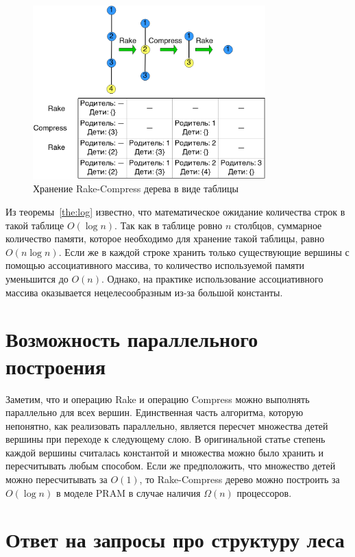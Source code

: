 \begin{figure}[h]
\centering
\includegraphics[width=0.8\textwidth]{pics/example.png}
\caption{Хранение Rake-Compress дерева в виде таблицы}
\label{pic:table}
\end{figure}


Из теоремы~\ref{the:log} известно, что математическое ожидание количества строк в такой таблице $O(\log n)$.  
Так как в таблице ровно $n$ столбцов, суммарное количество памяти, которое необходимо для хранение такой таблицы, равно $O(n \log n)$.
Если же в каждой строке хранить только существующие вершины с помощью ассоциативного массива, то количество используемой памяти уменьшится до $O(n)$. 
Однако, на практике использование ассоциативного массива оказывается нецелесообразным из-за большой константы.

\FloatBarrier
\section{Возможность параллельного построения}

Заметим, что и операцию Rake и операцию Compress можно выполнять параллельно для всех вершин. 
Единственная часть алгоритма, которую непонятно, как реализовать параллельно, является пересчет множества детей вершины при переходе к следующему слою. 
В оригинальной статье степень каждой вершины считалась константой и множества можно было хранить и пересчитывать любым способом. Если же предположить, 
что множество детей можно пересчитывать за $O(1)$, то Rake-Compress дерево можно построить за $O(\log n)$ в моделе PRAM в случае наличия $\Omega(n)$ процессоров.

\FloatBarrier
\section{Ответ на запросы про структуру леса}

